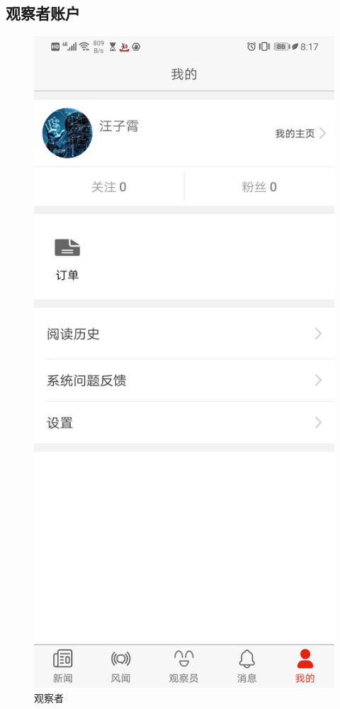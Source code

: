 \documentclass{article}
\begin{document}
\subsection{观察者账户}
\begin{figure}[h!]
 	\centering
 	\includegraphics[scale=0.11]{Watcher}
	\caption{观察者}
	\label{fig:Watcher}
\end{figure}
       
\end{document}
